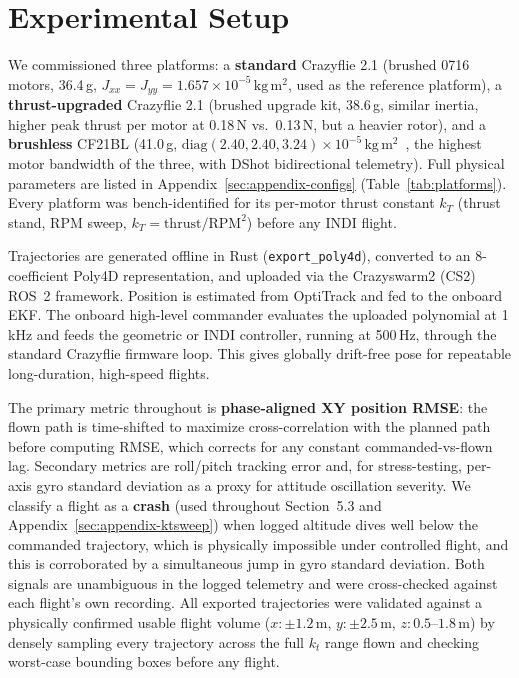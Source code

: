 \documentclass[11pt,a4paper]{article}
\newcommand{\code}[1]{\texttt{#1}}
\begin{document}
\section{Experimental Setup}

We commissioned three platforms: a \textbf{standard} Crazyflie 2.1 (brushed 0716 motors, 36.4\,g,
$J_{xx}=J_{yy}=1.657\times10^{-5}\,\mathrm{kg\,m^2}$, used as the reference platform), a
\textbf{thrust-upgraded} Crazyflie 2.1 (brushed upgrade kit, 38.6\,g, similar inertia, higher peak
thrust per motor at 0.18\,N vs.\ 0.13\,N, but a heavier rotor), and a \textbf{brushless} CF21BL
(41.0\,g, $\mathrm{diag}(2.40,2.40,3.24)\times10^{-5}\,\mathrm{kg\,m^2}$~\cite{busetto2025}, the
highest motor bandwidth of the three, with DShot bidirectional telemetry). Full physical
parameters are listed in Appendix~\ref{sec:appendix-configs} (Table~\ref{tab:platforms}). Every
platform was bench-identified for its per-motor thrust constant $k_T$ (thrust stand, RPM sweep,
$k_T=\mathrm{thrust}/\mathrm{RPM}^2$) before any INDI flight.

Trajectories are generated offline in Rust (\code{export\_poly4d}), converted to an 8-coefficient
Poly4D representation, and uploaded via the Crazyswarm2 (CS2) ROS~2 framework. Position is
estimated from OptiTrack and fed to the onboard EKF. The onboard high-level commander evaluates
the uploaded polynomial at 1\,kHz and feeds the geometric or INDI controller, running at
500\,Hz, through the standard Crazyflie firmware loop. This gives globally drift-free pose for
repeatable long-duration, high-speed flights.

The primary metric throughout is \textbf{phase-aligned XY position RMSE}: the flown path is
time-shifted to maximize cross-correlation with the planned path before computing RMSE, which
corrects for any constant commanded-vs-flown lag. Secondary metrics are roll/pitch tracking error
and, for stress-testing, per-axis gyro standard deviation as a proxy for attitude oscillation
severity. We classify a flight as a \textbf{crash} (used throughout Section~5.3 and
Appendix~\ref{sec:appendix-ktsweep}) when logged altitude dives well below the commanded
trajectory, which is physically impossible under controlled flight, and this is corroborated by a
simultaneous jump in gyro standard deviation. Both signals are unambiguous in the logged telemetry
and were cross-checked against each flight's own recording. All exported trajectories were
validated against a physically confirmed usable flight volume ($x{:}\pm1.2$\,m, $y{:}\pm2.5$\,m,
$z{:}0.5$--$1.8$\,m) by densely sampling every trajectory across the full $k_t$ range flown and
checking worst-case bounding boxes before any flight.
\end{document}
